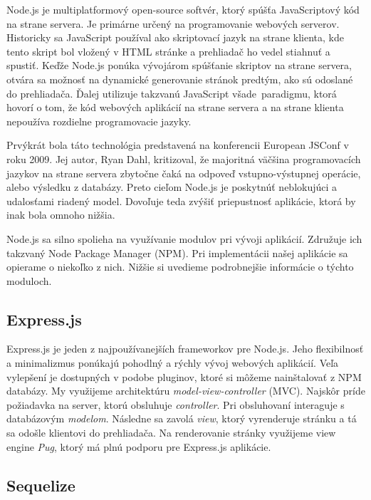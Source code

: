 Node.js je multiplatformový open-source softvér, ktorý spúšťa JavaScriptový
kód na strane servera. Je primárne určený na programovanie webových serverov.
Historicky sa JavaScript používal ako skriptovací jazyk
na strane klienta, kde tento skript bol vložený v HTML stránke a prehliadač ho vedel
stiahnuť a spustiť. Keďže Node.js ponúka vývojárom spúšťanie skriptov na strane servera,
otvára sa možnosť na dynamické generovanie stránok predtým, ako sú odoslané do
prehliadača. Ďalej utilizuje takzvanú \glqq JavaScript všade\grqq~paradigmu, ktorá
hovorí o tom, že kód webových aplikácií na strane servera a na strane klienta nepoužíva rozdielne programovacie jazyky.~\cite{bib:nodejs}

Prvýkrát bola táto technológia predstavená na konferencii European JSConf v roku 2009.
Jej autor, Ryan Dahl, kritizoval, že majoritná väčšina programovacích jazykov
na strane servera zbytočne čaká na odpoveď vstupno-výstupnej operácie, alebo
výsledku z databázy. Preto cieľom Node.js je poskytnúť neblokujúci a udalosťami
riadený model. Dovoľuje teda zvýšiť priepustnosť aplikácie, ktorá by inak bola omnoho
nižšia.

Node.js sa silno spolieha na využívanie modulov pri vývoji aplikácií. Združuje
ich takzvaný Node Package Manager (NPM). Pri implementácii našej aplikácie sa opierame
o niekoľko z nich. Nižšie si uvedieme podrobnejšie informácie o týchto moduloch. \cite{bib:crawford2017comparison}

\subsection{Express.js}
\label{sec:nodejs:expressjs}

Express.js je jeden z najpoužívanejších frameworkov pre Node.js. Jeho flexibilnosť
a minimalizmus ponúkajú pohodlný a rýchly vývoj webových aplikácií.
Veľa vylepšení je dostupných v podobe pluginov, ktoré si môžeme nainštalovať z NPM
databázy. My využijeme architektúru \textit{model-view-controller} (MVC). Najskôr príde
požiadavka na server, ktorú obsluhuje \textit{controller}. Pri obsluhovaní
interaguje s databázovým \textit{modelom}. Následne sa zavolá \textit{view}, ktorý 
vyrenderuje stránku a tá sa odošle klientovi do prehliadača. Na renderovanie
stránky využijeme view engine \textit{Pug}, ktorý má plnú podporu pre Express.js
aplikácie.

\subsection{Sequelize}
\label{sec:nodejs:sequelize}

